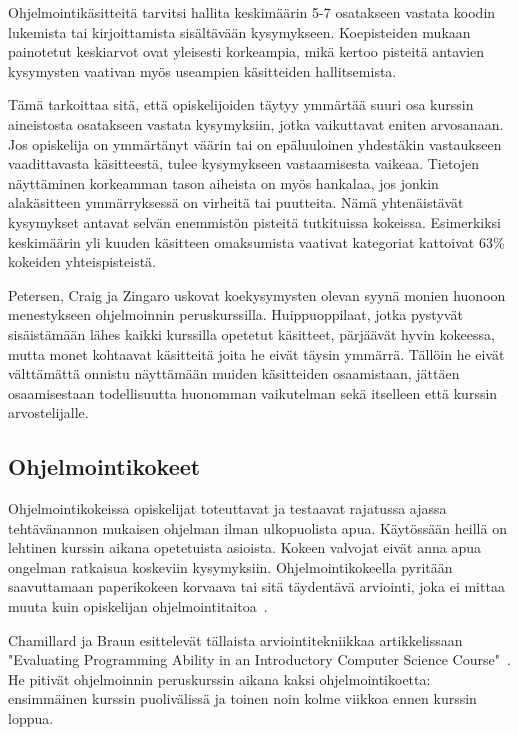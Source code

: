 \documentclass[finnish]{../tktltiki2}
\theoremstyle{definition}
\theoremstyle{remark}
\begin{document}
Ohjelmointikäsitteitä tarvitsi hallita keskimäärin 5-7 osatakseen vastata koodin lukemista tai kirjoittamista sisältävään kysymykseen. Koepisteiden mukaan painotetut keskiarvot ovat yleisesti korkeampia, mikä kertoo pisteitä antavien kysymysten vaativan myös useampien käsitteiden hallitsemista.

Tämä tarkoittaa sitä, että opiskelijoiden täytyy ymmärtää suuri osa kurssin aineistosta osatakseen vastata kysymyksiin, jotka vaikuttavat eniten arvosanaan. Jos opiskelija on ymmärtänyt väärin tai on epäluuloinen yhdestäkin vastaukseen vaadittavasta käsitteestä, tulee kysymykseen vastaamisesta vaikeaa. Tietojen näyttäminen korkeamman tason aiheista on myös hankalaa, jos jonkin alakäsitteen ymmärryksessä on virheitä tai puutteita. Nämä yhtenäistävät kysymykset antavat selvän enemmistön pisteitä tutkituissa kokeissa. Esimerkiksi keskimäärin yli kuuden käsitteen omaksumista vaativat kategoriat kattoivat 63\% kokeiden yhteispisteistä.

Petersen, Craig ja Zingaro uskovat koekysymysten olevan syynä monien huonoon menestykseen ohjelmoinnin peruskurssilla. Huippuoppilaat, jotka pystyvät sisäistämään lähes kaikki kurssilla opetetut käsitteet, pärjäävät hyvin kokeessa, mutta monet kohtaavat käsitteitä joita he eivät täysin ymmärrä. Tällöin he eivät välttämättä onnistu näyttämään muiden käsitteiden osaamistaan, jättäen osaamisestaan todellisuutta huonomman vaikutelman sekä itselleen että kurssin arvostelijalle.

\subsection{Ohjelmointikokeet}

Ohjelmointikokeissa opiskelijat toteuttavat ja testaavat rajatussa ajassa tehtävänannon mukaisen ohjelman ilman ulkopuolista apua. Käytössään heillä on lehtinen kurssin aikana opetetuista asioista. Kokeen valvojat eivät anna apua ongelman ratkaisua koskeviin kysymyksiin. Ohjelmointikokeella pyritään saavuttamaan paperikokeen korvaava tai sitä täydentävä arviointi, joka ei mittaa muuta kuin opiskelijan ohjelmointitaitoa~\cite{CB00, DW04}.

Chamillard ja Braun esittelevät tällaista arviointitekniikkaa artikkelissaan "Evaluating Programming Ability in an Introductory Computer Science Course"~\cite{CB00}. He pitivät ohjelmoinnin peruskurssin aikana kaksi ohjelmointikoetta: ensimmäinen kurssin puolivälissä ja toinen noin kolme viikkoa ennen kurssin loppua.
\end{document}
